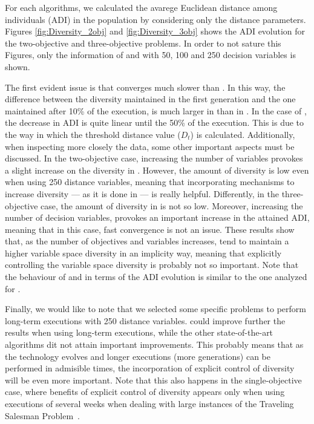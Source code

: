 For each algorithms, we calculated the avarege Euclidean distance among individuals (ADI) in the population by considering only 
the distance parameters.
%
Figures \ref{fig:Diversity_2obj} and \ref{fig:Diversity_3obj} shows the ADI evolution for the two-objective and three-objective problems.
%
In order to not sature this Figures, only the information of \VSDMOEA{} and \RMOEA{} with 50, 100 and 250 decision variables is shown.

%
The first evident issue is that \VSDMOEA{} converges much slower than \RMOEA{}.
%
In this way, the difference between the diversity maintained in the first generation and the one maintained after 10\% of the execution,
is much larger in \RMOEA{} than in \VSDMOEA{}.
%
In the case of \VSDMOEA{}, the decrease in ADI is quite linear until the 50\% of the execution.
%
This is due to the way in which the threshold distance value ($D_t$) is calculated.
%
Additionally, when inspecting more closely the data, some other important aspects must be discussed. 
%
In the two-objective case, increasing the number of variables provokes a slight increase on the diversity in \RMOEA{}.
%
However, the amount of diversity is low even when using 250 distance variables, meaning that incorporating mechanisms to increase diversity --- as it is done in \VSDMOEA{} ---
is really helpful.
%
Differently, in the three-objective case, the amount of diversity in \RMOEA{} is not so low.
%
Moreover, increasing the number of decision variables, provokes an important increase in the attained ADI, meaning that in this case,
fast convergence is not an issue.
%
These results show that, as the number of objectives and variables increases, \MOEAS{} tend to maintain a higher variable space diversity
in an implicity way, meaning that explicitly controlling the variable space diversity is probably not so important.
%
Note that the behaviour of \NSGAII{} and \MOEAD{} in terms of the ADI evolution is similar to the one analyzed for \RMOEA{}.

Finally, we would like to note that we selected some specific problems to perform long-term executions with 250 distance variables.
%
\VSDMOEA{} could improve further the results when using long-term executions, while the other state-of-the-art algorithms dit not attain
important improvements.
%
This probably means that as the technology evolves and longer executions (more generations) can be performed in admisible times,
the incorporation of explicit control of diversity will be even more important.
%
Note that this also happens in the single-objective case, where benefits of explicit control of diversity appears only when using executions of
several weeks when dealing with large instances of the Traveling Salesman Problem~\cite{segura2015novel}.
%



